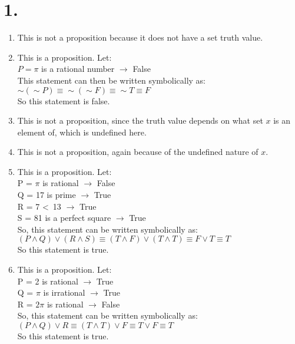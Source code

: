 \documentclass[12pt,letterpaper]{article}
\begin{document}
\section*{1.}


\begin{enumerate}[label= \textbf{\alph*)}]
	\item This is not a proposition because it does not have a set truth value.
	
	\item This is a proposition. Let: \\$P = \pi$ is a rational number $\rightarrow$ False\\
		This statement can then be written symbolically as:\\
		$\sim (\sim P) \equiv \sim (\sim F) \equiv \sim T \equiv F$\\
		So this statement is false.
	
	\item This is not a proposition, since the truth value depends on what set $x$ is an element of,
		which is undefined here.
	
	\item This is not a proposition, again because of the undefined nature of $x$.
	
	\item This is a proposition. Let: \\
		P = $\pi$ is rational $\rightarrow$ False\\
		Q = 17 is prime $\rightarrow$ True\\
		R = 7 \textless \ 13 $\rightarrow$ True\\
		S = 81 is a perfect square $\rightarrow$ True\\
		So, this statement can be written symbolically as:\\
		$(P \land Q) \lor (R \land S) \equiv (T \land F) \lor (T \land T) \equiv F \lor T \equiv T$\\
		So this statement is true.

	\item This is a proposition. Let: \\
		P = 2 is rational $\rightarrow$ True\\
		Q = $\pi$ is irrational $\rightarrow$ True\\
		R = $2\pi$ is rational $\rightarrow$ False\\
		So, this statement can be written symbolically as:\\
		$(P \land Q) \lor R \equiv (T \land T) \lor F \equiv T \lor F \equiv T$\\
		So this statement is true.


\end{enumerate}
\end{document}

